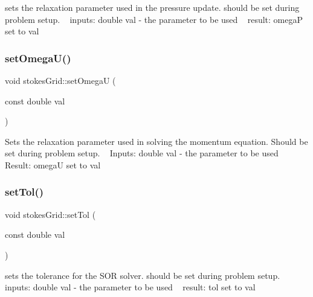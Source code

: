 sets the relaxation parameter used in the pressure update. should be set during problem setup. ~\newline
inputs\+: double val -\/ the parameter to be used ~\newline
result\+: omegaP set to val \mbox{\label{classstokesGrid_a5aee236f67595380ae097a388c7fd90f}} 
\subsubsection{\texorpdfstring{set\+Omega\+U()}{setOmegaU()}}
{\footnotesize\ttfamily void stokes\+Grid\+::set\+OmegaU (\begin{DoxyParamCaption}\item[{const double}]{val }\end{DoxyParamCaption})}

Sets the relaxation parameter used in solving the momentum equation. Should be set during problem setup. ~\newline
Inputs\+: double val -\/ the parameter to be used ~\newline
Result\+: omegaU set to val \mbox{\label{classstokesGrid_a659370bf6d4e8842bd2ad65044e08446}} 
\subsubsection{\texorpdfstring{set\+Tol()}{setTol()}}
{\footnotesize\ttfamily void stokes\+Grid\+::set\+Tol (\begin{DoxyParamCaption}\item[{const double}]{val }\end{DoxyParamCaption})}

sets the tolerance for the S\+OR solver. should be set during problem setup. ~\newline
inputs\+: double val -\/ the parameter to be used ~\newline
result\+: tol set to val \mbox{\label{classstokesGrid_ae2822f6f932eb55c68b9e1b6ad928d14}} 
